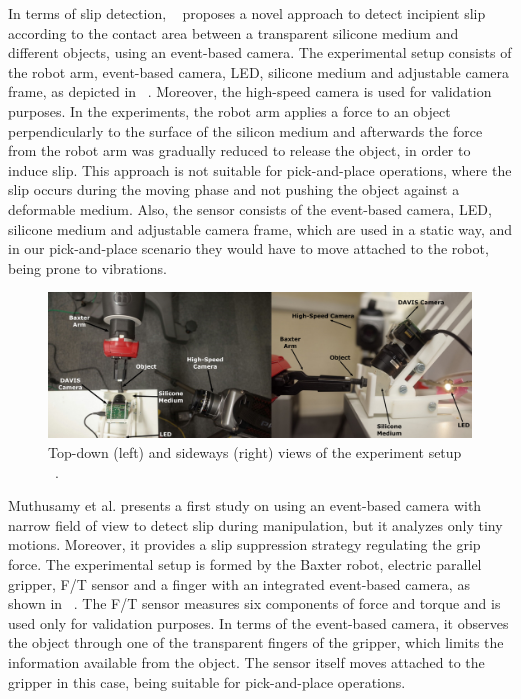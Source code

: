 In terms of slip detection, ~\cite{rigi2018} proposes a novel approach to detect incipient slip according to the contact area between a transparent silicone medium and different objects, using an event-based camera. The experimental setup consists of the robot arm, event-based camera, LED, silicone medium and adjustable camera frame, as depicted in ~. Moreover, the high-speed camera is used for validation purposes. In the experiments, the robot arm applies a force to an object perpendicularly to the surface of the silicon medium and afterwards the force from the robot arm was gradually reduced to release the object, in order to induce slip. This approach is not suitable for pick-and-place operations, where the slip occurs during the moving phase and not pushing the object against a deformable medium. Also, the sensor consists of the event-based camera, LED, silicone medium and adjustable camera frame, which are used in a static way, and in our pick-and-place scenario they would have to move attached to the robot, being prone to vibrations.\\

\begin{figure}[h]
    \centering
    \includegraphics[width=\textwidth]{resources/images/rigi2018}
    \caption{Top-down (left) and sideways (right) views of the experiment setup ~\cite{rigi2018}.}\label{fig:rigi2018}
\end{figure}

Muthusamy et al. \cite{muthusamy2020slip} presents a first study on using an event-based camera with narrow field of view to detect slip during manipulation, but it analyzes only tiny motions. Moreover, it provides a slip suppression strategy regulating the grip force. The experimental setup is formed by the Baxter robot, electric parallel gripper, F/T sensor and a finger with an integrated event-based camera, as shown in ~. The F/T sensor measures six components of force and torque and is used only for validation purposes. In terms of the event-based camera, it observes the object through one of the transparent fingers of the gripper, which limits the information available from the object. The sensor itself moves attached to the gripper in this case, being suitable for pick-and-place operations.

